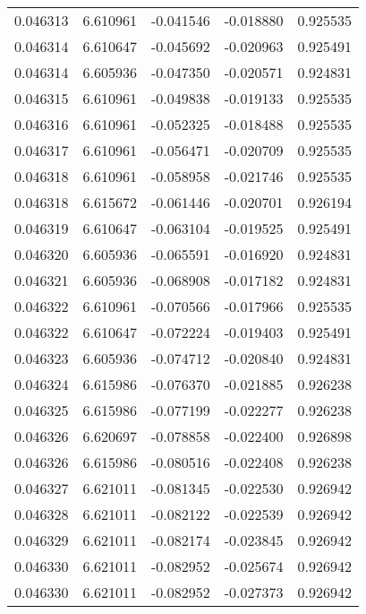 \begin{tabular}{lrrrr}
0.046313    &  6.610961 & -0.041546 & -0.018880 &             0.925535 \\
0.046314    &  6.610647 & -0.045692 & -0.020963 &             0.925491 \\
0.046314    &  6.605936 & -0.047350 & -0.020571 &             0.924831 \\
0.046315    &  6.610961 & -0.049838 & -0.019133 &             0.925535 \\
0.046316    &  6.610961 & -0.052325 & -0.018488 &             0.925535 \\
0.046317    &  6.610961 & -0.056471 & -0.020709 &             0.925535 \\
0.046318    &  6.610961 & -0.058958 & -0.021746 &             0.925535 \\
0.046318    &  6.615672 & -0.061446 & -0.020701 &             0.926194 \\
0.046319    &  6.610647 & -0.063104 & -0.019525 &             0.925491 \\
0.046320    &  6.605936 & -0.065591 & -0.016920 &             0.924831 \\
0.046321    &  6.605936 & -0.068908 & -0.017182 &             0.924831 \\
0.046322    &  6.610961 & -0.070566 & -0.017966 &             0.925535 \\
0.046322    &  6.610647 & -0.072224 & -0.019403 &             0.925491 \\
0.046323    &  6.605936 & -0.074712 & -0.020840 &             0.924831 \\
0.046324    &  6.615986 & -0.076370 & -0.021885 &             0.926238 \\
0.046325    &  6.615986 & -0.077199 & -0.022277 &             0.926238 \\
0.046326    &  6.620697 & -0.078858 & -0.022400 &             0.926898 \\
0.046326    &  6.615986 & -0.080516 & -0.022408 &             0.926238 \\
0.046327    &  6.621011 & -0.081345 & -0.022530 &             0.926942 \\
0.046328    &  6.621011 & -0.082122 & -0.022539 &             0.926942 \\
0.046329    &  6.621011 & -0.082174 & -0.023845 &             0.926942 \\
0.046330    &  6.621011 & -0.082952 & -0.025674 &             0.926942 \\
0.046330    &  6.621011 & -0.082952 & -0.027373 &             0.926942 \\

\end{tabular}
